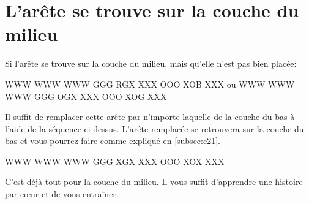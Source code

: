 \newpage
\section{L'arête se trouve sur la couche du milieu}

Si l'arête se trouve sur la couche du milieu, mais qu'elle n'est pas bien placée:
\smallskip

\begin{center}
	
	\RubikFaceUp%
	{W}{W}{W}%
	{W}{W}{W}%
	{W}{W}{W}
	\RubikFaceRight%
	{G}{G}{G}%
	{R}{G}{X}%
	{X}{X}{X}
	\RubikFaceFront%
	{O}{O}{O}%
	{X}{O}{B}%
	{X}{X}{X}
	\hspace*{5mm}ou\hspace*{3mm} 	
	\RubikFaceUp%
	{W}{W}{W}%
	{W}{W}{W}%
	{W}{W}{W}
	\RubikFaceRight%
	{G}{G}{G}%
	{O}{G}{X}%
	{X}{X}{X}
	\RubikFaceFront%
	{O}{O}{O}%
	{X}{O}{G}%
	{X}{X}{X}
\end{center}
\smallskip

Il suffit de remplacer cette arête par n'importe laquelle de la couche du bas à l'aide de la séquence ci-dessus. L'arête remplacée se retrouvera sur la couche du bas et vous pourrez faire comme expliqué en \ref{subsec:c21}.

\smallskip
\begin{center}	
	\RubikFaceUp%
	{W}{W}{W}%
	{W}{W}{W}%
	{W}{W}{W}
	\RubikFaceRight%
	{G}{G}{G}%
	{X}{G}{X}%
	{X}{X}{X}
	\RubikFaceFront%
	{O}{O}{O}%
	{X}{O}{X}%
	{X}{X}{X}
\end{center}
\smallskip

C'est déjà tout pour la couche du milieu. Il vous suffit d'apprendre une histoire par cœur et de vous entraîner.
